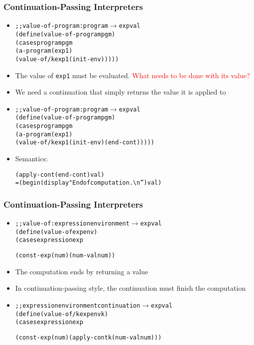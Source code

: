 \documentclass{beamer}
\newcommand{\arrow}{\(\rightarrow\)}
\begin{document}
\begin{frame}[fragile]
\frametitle{Continuation-Passing Interpreters}
\begin{scriptsize}
\begin{itemize}
\item<1->
\begin{alltt}
;; value-of-program : program \arrow{} expval
(define (value-of-program pgm)
  (cases program pgm
    (a-program (exp1)
               (value-of/k exp1 (init-env)))))
\end{alltt}

\item<1-> The value of \texttt{exp1} must be evaluated. \textcolor{red}{What needs to be done with its value?}

\item<2-> We need a continuation that simply returns the value it is applied to

\item<3->
\begin{alltt}
;; value-of-program : program \arrow{} expval
(define (value-of-program pgm)
  (cases program pgm
    (a-program (exp1)
               (value-of/k exp1 (init-env) (end-cont)))))
\end{alltt}

\item<3-> Semantics:
\begin{alltt}
  (apply-cont (end-cont) val)
= (begin (display "End of computation.\textbackslash{}n”) val)
\end{alltt}

\end{itemize}
\end{scriptsize}
\end{frame}

\begin{frame}[fragile]
\frametitle{Continuation-Passing Interpreters}
\begin{scriptsize}
\begin{itemize}
\item<1->
\begin{alltt}
;; value-of : expression environment \arrow{} expval
(define (value-of exp env)
  (cases expression exp

    (const-exp (num) (num-val num))
\end{alltt}

\item<1-> The computation ends by returning a value

\item<1-> In continuation-passing style, the continuation must finish the computation

\item<2->
\begin{alltt}
;; expression environment continuation \arrow{} expval
(define (value-of/k exp env k)
  (cases expression exp

    (const-exp (num) (apply-cont k (num-val num)))
\end{alltt}

\end{itemize}
\end{scriptsize}
\end{frame}
\end{document}

